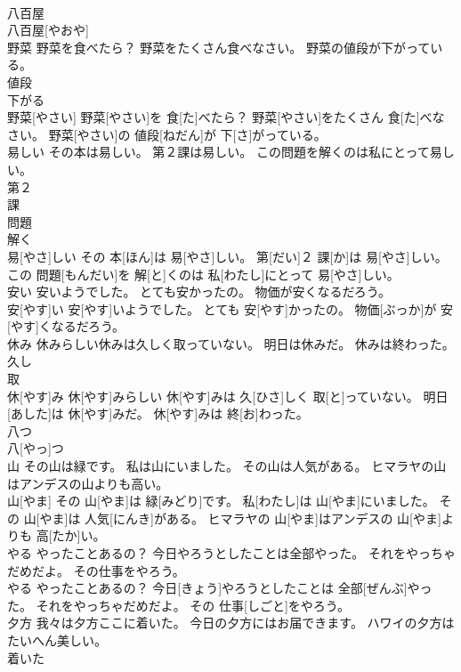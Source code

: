 \documentclass[8pt]{extreport}
\begin{document}
\begin{CJK}{UTF8}{min}
\\	八百屋	
\\	八百屋[やおや]
\\	野菜 野菜を食べたら？ 野菜をたくさん食べなさい。 野菜の値段が下がっている。	
\\	値段 
\\	下がる 
\\	野菜[やさい] 野菜[やさい]を 食[た]べたら？ 野菜[やさい]をたくさん 食[た]べなさい。 野菜[やさい]の 値段[ねだん]が 下[さ]がっている。
\\	易しい その本は易しい。 第２課は易しい。 この問題を解くのは私にとって易しい。	
\\	第２ 
\\	課 
\\	問題 
\\	解く 
\\	易[やさ]しい その 本[ほん]は 易[やさ]しい。 第[だい]２ 課[か]は 易[やさ]しい。 この 問題[もんだい]を 解[と]くのは 私[わたし]にとって 易[やさ]しい。
\\	安い 安いようでした。 とても安かったの。 物価が安くなるだろう。	
\\	安[やす]い 安[やす]いようでした。 とても 安[やす]かったの。 物価[ぶっか]が 安[やす]くなるだろう。
\\	休み 休みらしい休みは久しく取っていない。 明日は休みだ。 休みは終わった。	
\\	久し 
\\	取 
\\	休[やす]み 休[やす]みらしい 休[やす]みは 久[ひさ]しく 取[と]っていない。 明日[あした]は 休[やす]みだ。 休[やす]みは 終[お]わった。
\\	八つ	
\\	八[やっ]つ
\\	山 その山は緑です。 私は山にいました。 その山は人気がある。 ヒマラヤの山はアンデスの山よりも高い。	
\\	山[やま] その 山[やま]は 緑[みどり]です。 私[わたし]は 山[やま]にいました。 その 山[やま]は 人気[にんき]がある。 ヒマラヤの 山[やま]はアンデスの 山[やま]よりも 高[たか]い。
\\	やる やったことあるの？ 今日やろうとしたことは全部やった。 それをやっちゃだめだよ。 その仕事をやろう。	
\\	やる やったことあるの？ 今日[きょう]やろうとしたことは 全部[ぜんぶ]やった。 それをやっちゃだめだよ。 その 仕事[しごと]をやろう。
\\	夕方 我々は夕方ここに着いた。 今日の夕方にはお届できます。 ハワイの夕方はたいへん美しい。	
\\	着いた 

\end{CJK}
\end{document}
